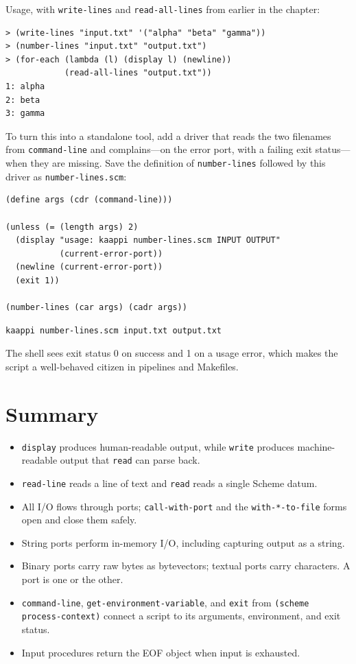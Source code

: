 Usage, with \texttt{write-lines} and \texttt{read-all-lines} from earlier in the chapter:

\begin{lstlisting}[style=repl]
> (write-lines "input.txt" '("alpha" "beta" "gamma"))
> (number-lines "input.txt" "output.txt")
> (for-each (lambda (l) (display l) (newline))
            (read-all-lines "output.txt"))
1: alpha
2: beta
3: gamma
\end{lstlisting}

To turn this into a standalone tool, add a driver that reads the two filenames from \texttt{command-line} and complains---on the error port, with a failing exit status---when they are missing. Save the definition of \texttt{number-lines} followed by this driver as \texttt{number-lines.scm}:

\begin{lstlisting}
(define args (cdr (command-line)))

(unless (= (length args) 2)
  (display "usage: kaappi number-lines.scm INPUT OUTPUT"
           (current-error-port))
  (newline (current-error-port))
  (exit 1))

(number-lines (car args) (cadr args))
\end{lstlisting}

\begin{Verbatim}[fontsize=\small]
kaappi number-lines.scm input.txt output.txt
\end{Verbatim}

The shell sees exit status 0 on success and 1 on a usage error, which makes the script a well-behaved citizen in pipelines and Makefiles.

\section*{Summary}

\begin{itemize}
    \item \texttt{display} produces human-readable output, while \texttt{write} produces machine-readable output that \texttt{read} can parse back.
    \item \texttt{read-line} reads a line of text and \texttt{read} reads a single Scheme datum.
    \item All I/O flows through ports; \texttt{call-with-port} and the \texttt{with-*-to-file} forms open and close them safely.
    \item String ports perform in-memory I/O, including capturing output as a string.
    \item Binary ports carry raw bytes as bytevectors; textual ports carry characters. A port is one or the other.
    \item \texttt{command-line}, \texttt{get-environment-variable}, and \texttt{exit} from \texttt{(scheme process-context)} connect a script to its arguments, environment, and exit status.
    \item Input procedures return the EOF object when input is exhausted.
\end{itemize}

